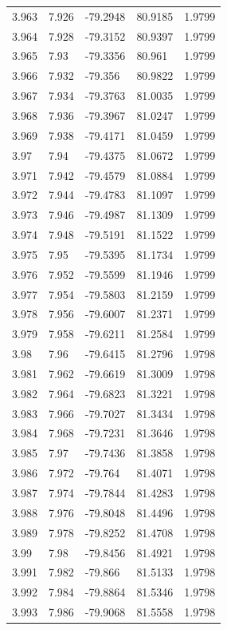 \begin{tabular}{lllll}
3.963 & 7.926 & -79.2948 & 80.9185 & 1.9799 \\
3.964 & 7.928 & -79.3152 & 80.9397 & 1.9799 \\
3.965 & 7.93 & -79.3356 & 80.961 & 1.9799 \\
3.966 & 7.932 & -79.356 & 80.9822 & 1.9799 \\
3.967 & 7.934 & -79.3763 & 81.0035 & 1.9799 \\
3.968 & 7.936 & -79.3967 & 81.0247 & 1.9799 \\
3.969 & 7.938 & -79.4171 & 81.0459 & 1.9799 \\
3.97 & 7.94 & -79.4375 & 81.0672 & 1.9799 \\
3.971 & 7.942 & -79.4579 & 81.0884 & 1.9799 \\
3.972 & 7.944 & -79.4783 & 81.1097 & 1.9799 \\
3.973 & 7.946 & -79.4987 & 81.1309 & 1.9799 \\
3.974 & 7.948 & -79.5191 & 81.1522 & 1.9799 \\
3.975 & 7.95 & -79.5395 & 81.1734 & 1.9799 \\
3.976 & 7.952 & -79.5599 & 81.1946 & 1.9799 \\
3.977 & 7.954 & -79.5803 & 81.2159 & 1.9799 \\
3.978 & 7.956 & -79.6007 & 81.2371 & 1.9799 \\
3.979 & 7.958 & -79.6211 & 81.2584 & 1.9799 \\
3.98 & 7.96 & -79.6415 & 81.2796 & 1.9798 \\
3.981 & 7.962 & -79.6619 & 81.3009 & 1.9798 \\
3.982 & 7.964 & -79.6823 & 81.3221 & 1.9798 \\
3.983 & 7.966 & -79.7027 & 81.3434 & 1.9798 \\
3.984 & 7.968 & -79.7231 & 81.3646 & 1.9798 \\
3.985 & 7.97 & -79.7436 & 81.3858 & 1.9798 \\
3.986 & 7.972 & -79.764 & 81.4071 & 1.9798 \\
3.987 & 7.974 & -79.7844 & 81.4283 & 1.9798 \\
3.988 & 7.976 & -79.8048 & 81.4496 & 1.9798 \\
3.989 & 7.978 & -79.8252 & 81.4708 & 1.9798 \\
3.99 & 7.98 & -79.8456 & 81.4921 & 1.9798 \\
3.991 & 7.982 & -79.866 & 81.5133 & 1.9798 \\
3.992 & 7.984 & -79.8864 & 81.5346 & 1.9798 \\
3.993 & 7.986 & -79.9068 & 81.5558 & 1.9798 \\

\end{tabular}
